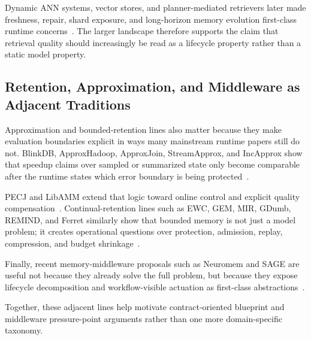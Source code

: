 Dynamic ANN systems, vector stores, and planner-mediated retrievers later made freshness, repair, shard exposure, and long-horizon memory evolution first-class runtime concerns~\cite{singh2021freshdiskann,wang2021milvus,guo2022manu,asai2024selfrag,zhang2026flowrag,wang2026candor}. The larger landscape therefore supports the claim that retrieval quality should increasingly be read as a lifecycle property rather than a static model property.

\subsection{Retention, Approximation, and Middleware as Adjacent Traditions}

Approximation and bounded-retention lines also matter because they make evaluation boundaries explicit in ways many mainstream runtime papers still do not. BlinkDB, ApproxHadoop, ApproxJoin, StreamApprox, and IncApprox show that speedup claims over sampled or summarized state only become comparable after the runtime states which error boundary is being protected~\cite{agarwal2013blinkdb,goiri2015approxhadoop,wang2018approxjoin,hu2018streamapprox,chen2018incapprox}.

PECJ and LibAMM extend that logic toward online control and explicit quality compensation~\cite{zeng2024pecj,zeng2024libamm}. Continual-retention lines such as EWC, GEM, MIR, GDumb, REMIND, and Ferret similarly show that bounded memory is not just a model problem; it creates operational questions over protection, admission, replay, compression, and budget shrinkage~\cite{kirkpatrick2017ewc,lopez2017gem,aljundi2019mir,prabhu2020gdumb,hayes2020remind,zhou2025ferret}.

Finally, recent memory-middleware proposals such as Neuromem and SAGE are useful not because they already solve the full problem, but because they expose lifecycle decomposition and workflow-visible actuation as first-class abstractions~\cite{zhang2026neuromem,liu2026sage}.

Together, these adjacent lines help motivate contract-oriented blueprint and middleware pressure-point arguments rather than one more domain-specific taxonomy.
